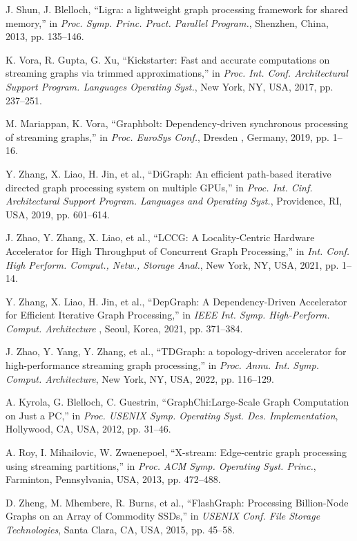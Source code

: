 \documentclass[lettersize,journal]{IEEEtran} %
\begin{document}
\begin{thebibliography}{100}
  J. Shun, J. Blelloch, ``Ligra: a lightweight graph processing framework for shared memory,'' in \textit{Proc. Symp. Princ. Pract. Parallel Program.}, Shenzhen, China, 2013, pp. 135--146.
  
  K. Vora, R. Gupta, G. Xu, ``Kickstarter: Fast and accurate computations on streaming graphs via trimmed approximations,'' in \textit{Proc. Int. Conf. Architectural Support Program. Languages Operating Syst.}, New York, NY, USA, 2017, pp. 237--251.
  
  M. Mariappan, K. Vora, ``Graphbolt: Dependency-driven synchronous processing of streaming graphs,'' in \textit{Proc. EuroSys Conf.}, Dresden , Germany, 2019, pp. 1--16.
  
  Y. Zhang, X. Liao, H. Jin, et al., ``DiGraph: An efficient path-based iterative directed graph processing system on multiple GPUs,'' in \textit{Proc. Int. Cinf. Architectural Support Program. Languages and Operating Syst.}, Providence, RI, USA, 2019, pp. 601--614.
  
  J. Zhao, Y. Zhang, X. Liao, et al., ``LCCG: A Locality-Centric Hardware Accelerator for High Throughput of Concurrent Graph Processing,'' in \textit{Int. Conf. High Perform. Comput., Netw., Storage Anal.}, New York, NY, USA, 2021, pp. 1--14.
  
  Y. Zhang, X. Liao, H. Jin, et al., ``DepGraph: A Dependency-Driven Accelerator for Efficient Iterative Graph Processing,'' in \textit{IEEE Int. Symp. High-Perform. Comput. Architecture }, Seoul, Korea, 2021, pp. 371--384.
  
  J. Zhao, Y. Yang, Y. Zhang, et al., ``TDGraph: a topology-driven accelerator for high-performance streaming graph processing,'' in \textit{Proc. Annu. Int. Symp. Comput. Architecture}, New York, NY, USA, 2022, pp. 116--129.
  
  A. Kyrola, G. Blelloch, C. Guestrin, ``{GraphChi}:{Large-Scale} Graph Computation on Just a {PC},'' in \textit{Proc. USENIX Symp. Operating Syst. Des. Implementation}, Hollywood, CA, USA, 2012, pp. 31--46.
  
  A. Roy, I. Mihailovic, W. Zwaenepoel,  ``X-stream: Edge-centric graph processing using streaming partitions,'' in \textit{Proc. ACM Symp. Operating Syst. Princ.}, Farminton, Pennsylvania, USA, 2013, pp. 472--488.
  
  D. Zheng, M. Mhembere, R. Burns, et al., ``{FlashGraph}: Processing {Billion-Node} Graphs on an Array of Commodity {SSDs},'' in \textit{USENIX Conf. File Storage Technologies}, Santa Clara, CA, USA, 2015, pp. 45--58.
  

\end{thebibliography}
\end{document}
